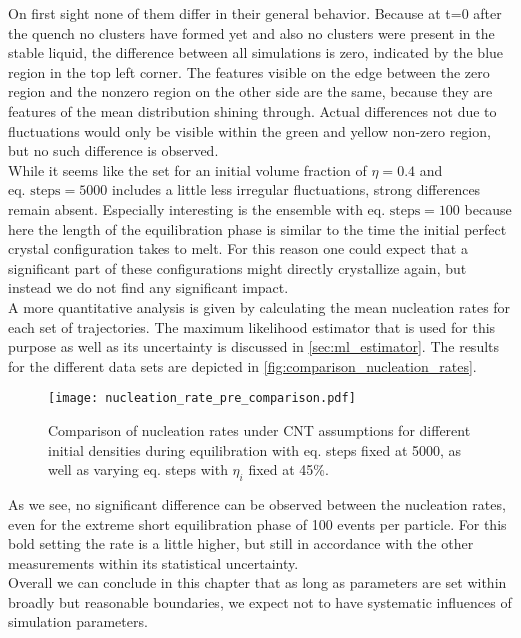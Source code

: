 On first sight none of them differ in their general behavior. Because at t=0 after the quench no clusters have formed yet and also no clusters were present in the stable liquid, the difference between all simulations is zero, indicated by the blue region in the top left corner. The features visible on the edge between the zero region and the nonzero region on the other side are the same, because they are features of the mean distribution shining through. Actual differences not due to fluctuations would only be visible within the green and yellow non-zero region, but no such difference is observed.\\

While it seems like the set for an initial volume fraction of $\eta=0.4$ and $\text{eq. steps} = 5000$ includes a little less irregular fluctuations, strong differences remain absent. Especially interesting is the ensemble with $\text{eq. steps} = 100$ because here the length of the equilibration phase is similar to the time the initial perfect crystal configuration takes to melt. For this reason one could expect that a significant part of these configurations might directly crystallize again, but instead we do not find any significant impact.\\

A more quantitative analysis is given by calculating the mean nucleation rates for each set of trajectories. The maximum likelihood estimator that is used for this purpose as well as its uncertainty is discussed in \autoref{sec:ml_estimator}. The results for the different data sets are depicted in \autoref{fig:comparison_nucleation_rates}.
\begin{figure}[h!]
\centering
\texttt{[image: nucleation\_rate\_pre\_comparison.pdf]}
\caption[Nucleation rates of equilibration test measurements]{Comparison of nucleation rates under CNT assumptions for different initial densities during equilibration with eq. steps fixed at 5000, as well as varying eq. steps with $\eta_i$ fixed at 45\%. }
\label{fig:comparison_nucleation_rates}
\end{figure}

As we see, no significant difference can be observed between the nucleation rates, even for the extreme short equilibration phase of 100 events per particle. For this bold setting the rate is a little higher, but still in accordance with the other measurements within its statistical uncertainty.\\

Overall we can conclude in this chapter that as long as parameters are set within broadly but reasonable boundaries, we expect not to have systematic influences of simulation parameters. 

